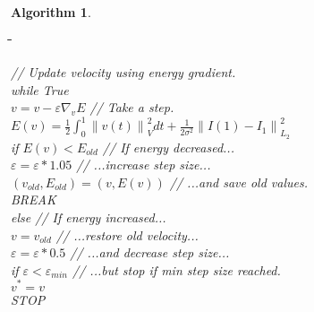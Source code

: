 \documentclass[a4paper,12pt]{article}
\newtheorem{algorithm}{Algorithm}
\newenvironment{listing}
{
  \ttfamily 		%
  \begin{tabbing} 	%
  \hspace*{1cm}\=\hspace*{1cm}\=\hspace*{1cm}\=\hspace*{1cm}\=\hspace*{1cm}\= \kill %
}
{
  \end{tabbing}
}
\newcommand{\norm}[1]{\left\lVert#1\right\rVert} 	%
\begin{document}
\begin{algorithm}
\begin{listing}
  \> // Update velocity using energy gradient. \\
  \> while True\\
  \>\> $v = v - \varepsilon \nabla_v E $ // Take a step.\\
  \>\> $E(v) = \frac{1}{2}\int_0^1 \norm{v(t)}_V^2 dt + \frac{1}{2\sigma^2}\norm{I(1) - I_1}_{L_2}^2$ \\
  \>\> if $E(v) < E_{old}$ // If energy decreased...\\
  \>\>\> $\varepsilon = \varepsilon * 1.05 $ // ...increase step size...\\
  \>\>\> $(v_{old},E_{old}) = (v,E(v))$ // ...and save old values.\\ 
  \>\>\> BREAK \\
  \>\> else // If energy increased...\\
  \>\>\> $v = v_{old}$  // ...restore old velocity...\\
  \>\>\> $\varepsilon = \varepsilon * 0.5 $ // ...and decrease step size...\\
  \>\>\> if $\varepsilon < \varepsilon_{min}$  // ...but stop if min step size reached. \\
  \>\>\>\> $v^* = v$ \\
  \>\>\>\> STOP \\

 \end{listing}
\end{algorithm}
\end{document}
